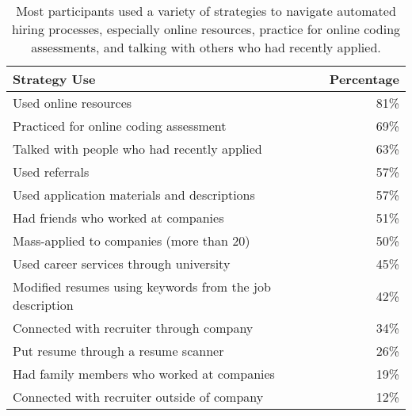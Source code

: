 \begin{table}
\begin{tabular}{lr} \hline
\textbf{Strategy Use} & \textbf{Percentage} \\ \hline                    
    \hspace{2mm}Used online resources              & 81\% \\ 
    \hspace{2mm}Practiced for online coding assessment              & 69\% \\ 
    \hspace{2mm}Talked with people who had recently applied              & 63\% \\ 
    \hspace{2mm}Used referrals              & 57\% \\ 
    \hspace{2mm}Used application materials and descriptions              & 57\% \\ 
    \hspace{2mm}Had friends who worked at companies                      & 51\% \\
    \hspace{2mm}Mass-applied to companies (more than 20)                 & 50\% \\ 
    \hspace{2mm}Used career services through university                  & 45\% \\
    \hspace{2mm}Modified resumes using keywords from the job description & 42\% \\
    \hspace{2mm}Connected with recruiter through company                 & 34\% \\         
    \hspace{2mm}Put resume through a resume scanner                      & 26\% \\       
    \hspace{2mm}Had family members who worked at companies               & 19\% \\              
    \hspace{2mm}Connected with recruiter outside of company              & 12\% \\ \hline
\end{tabular}
\caption{\label{tab:strategies} Most participants used a variety of strategies to navigate automated hiring processes, especially  online resources, practice for online coding assessments, and talking with others who had recently applied.}
\end{table}

